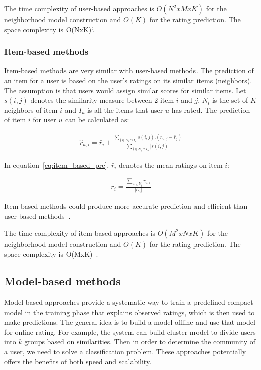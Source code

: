 \documentclass[oneside,13pt]{extreport}
\begin{document}
The time complexity of user-based approaches is $O(N^2xMxK)$ for the neighborhood model construction and $O(K)$ for the rating prediction. The  space complexity is O(NxK)`\cite{Chevalier}.

\subsubsection{Item-based methods}
Item-based methods are very similar with user-based methods. The prediction of an item for a user is based on the user’s ratings on its similar items (neighbors). The assumption is that users would assign similar
scores for similar items. Let $s\left( {i,j} \right)$ denotes the similarity measure between 2 item $i$ and $j$. $N_i$ is the set of $K$ neighbors of item $i$ and $I_u$ is all the items that user $u$ has rated. The prediction of item $i$ for user $u$ can be calculated as:

\begin{eqnarray}
\label{eq:item_based_pre}
\hat r_{u,i} = \bar r_i+\frac{{\sum\limits_{j \in {N_i} \cap {I_u}} {{s\left( {i,j} \right)}.({r_{u,j}}-\bar r_j)} }}{{\sum\limits_{j \in {N_i} \cap {I_u}}  {\left| {s\left( {i,j} \right)} \right|} }}
\end{eqnarray}

In equation~\ref{eq:item_based_pre}, $\bar r_i$ denotes the mean ratings on item $i$:

\begin{eqnarray}
\label{eq:mean_rating_item}
\bar r_i = \frac{{\sum\nolimits_{u \in {U_i}} {{r_{u,i}}} }}{{\left| {{U_i}} \right|}}
\end{eqnarray}

Item-based methods could produce more accurate prediction and efficient than user based-methods~\cite{Sarwar01}.

The time complexity of item-based approaches is $O(M^2xNxK)$ for the neighborhood model construction and $O(K)$ for the rating prediction. The  space complexity is O(MxK)~\cite{Chevalier}.
\subsection{Model-based methods}
Model-based approaches provide a systematic way to train a predefined compact model in the training phase that explains observed ratings, which is then used to make predictions. The general idea is to build a model offline and use that model for online rating. For example, the system can build cluster model to divide users into $k$ groups based on similarities. Then in order to determine the community of a user, we need to solve a classification problem. These approaches potentially offers the benefits of both speed and scalability.
\end{document}
